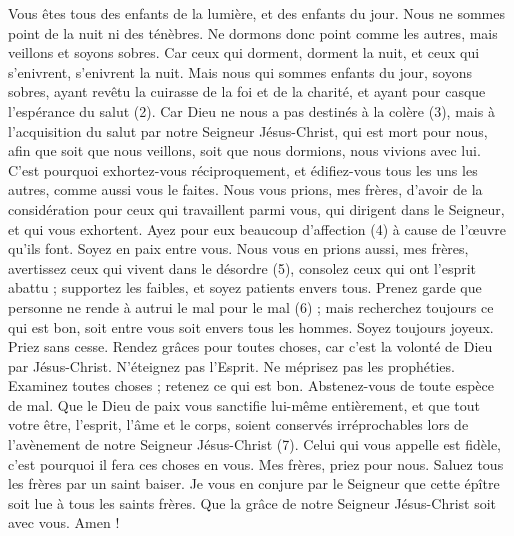 \begin{multicols}{2}
Vous êtes tous des enfants de la lumière, et des enfants du jour. Nous ne sommes point de la nuit ni des ténèbres.
Ne dormons donc point comme les autres, mais veillons et soyons sobres.
Car ceux qui dorment, dorment la nuit, et ceux qui s'enivrent, s'enivrent la nuit.
Mais nous qui sommes enfants du jour, soyons sobres, ayant revêtu la cuirasse de la foi et de la charité, et ayant pour casque l'espérance du salut (2).
Car Dieu ne nous a pas destinés à la colère (3), mais à l'acquisition du salut par notre Seigneur Jésus-Christ,
qui est mort pour nous, afin que soit que nous veillons, soit que nous dormions, nous vivions avec lui.
C'est pourquoi exhortez-vous réciproquement, et édifiez-vous tous les uns les autres, comme aussi vous le faites.
Nous vous prions, mes frères, d’avoir de la considération pour ceux qui travaillent parmi vous, qui dirigent dans le Seigneur, et qui vous exhortent.
Ayez pour eux beaucoup d’affection (4) à cause de l’œuvre qu'ils font. Soyez en paix entre vous.
Nous vous en prions aussi, mes frères, avertissez ceux qui vivent dans le désordre (5), consolez ceux qui ont l'esprit abattu ; supportez les faibles, et soyez patients envers tous.
Prenez garde que personne ne rende à autrui le mal pour le mal (6) ; mais recherchez toujours ce qui est bon, soit entre vous soit envers tous les hommes.
Soyez toujours joyeux.
Priez sans cesse.
Rendez grâces pour toutes choses, car c'est la volonté de Dieu par Jésus-Christ.
N'éteignez pas l'Esprit.
Ne méprisez pas les prophéties.
Examinez toutes choses ; retenez ce qui est bon.
Abstenez-vous de toute espèce de mal.
Que le Dieu de paix vous sanctifie lui-même entièrement, et que tout votre être, l’esprit, l'âme et le corps, soient conservés irréprochables lors de l’avènement de notre Seigneur Jésus-Christ (7).
Celui qui vous appelle est fidèle, c'est pourquoi il fera ces choses en vous.
\TextTitle{[Conclusion]}
Mes frères, priez pour nous.
Saluez tous les frères par un saint baiser.
Je vous en conjure par le Seigneur que cette épître soit lue à tous les saints frères.
Que la grâce de notre Seigneur Jésus-Christ soit avec vous. Amen !
\PPE{}
\end{multicols}

